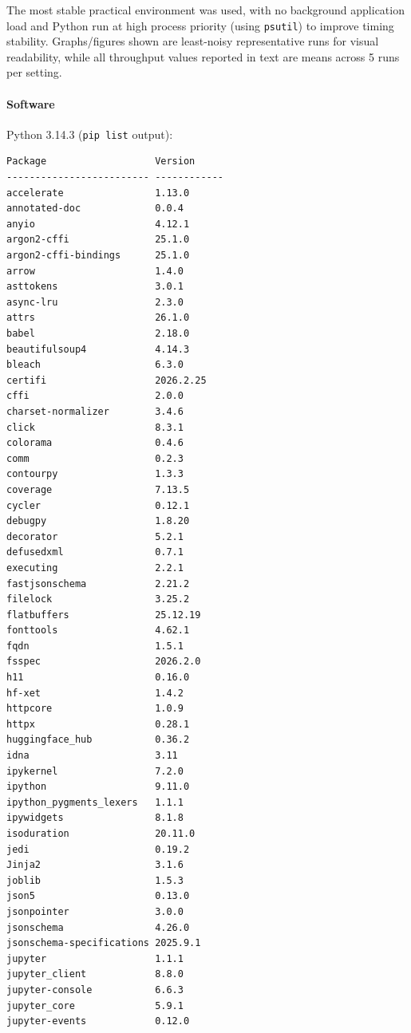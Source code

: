 \documentclass{article}
\begin{document}
The most stable practical environment was used, with no background
application load and Python run at high process priority (using
\texttt{psutil}) to improve timing stability. Graphs/figures shown are
least-noisy representative runs for visual readability, while all
throughput values reported in text are means across 5 runs per setting.

\hypertarget{software}{%
\paragraph{Software}\label{software}}

Python 3.14.3 (\texttt{pip\ list} output):

\begin{verbatim}
Package                   Version
------------------------- ------------
accelerate                1.13.0
annotated-doc             0.0.4
anyio                     4.12.1
argon2-cffi               25.1.0
argon2-cffi-bindings      25.1.0
arrow                     1.4.0
asttokens                 3.0.1
async-lru                 2.3.0
attrs                     26.1.0
babel                     2.18.0
beautifulsoup4            4.14.3
bleach                    6.3.0
certifi                   2026.2.25
cffi                      2.0.0
charset-normalizer        3.4.6
click                     8.3.1
colorama                  0.4.6
comm                      0.2.3
contourpy                 1.3.3
coverage                  7.13.5
cycler                    0.12.1
debugpy                   1.8.20
decorator                 5.2.1
defusedxml                0.7.1
executing                 2.2.1
fastjsonschema            2.21.2
filelock                  3.25.2
flatbuffers               25.12.19
fonttools                 4.62.1
fqdn                      1.5.1
fsspec                    2026.2.0
h11                       0.16.0
hf-xet                    1.4.2
httpcore                  1.0.9
httpx                     0.28.1
huggingface_hub           0.36.2
idna                      3.11
ipykernel                 7.2.0
ipython                   9.11.0
ipython_pygments_lexers   1.1.1
ipywidgets                8.1.8
isoduration               20.11.0
jedi                      0.19.2
Jinja2                    3.1.6
joblib                    1.5.3
json5                     0.13.0
jsonpointer               3.0.0
jsonschema                4.26.0
jsonschema-specifications 2025.9.1
jupyter                   1.1.1
jupyter_client            8.8.0
jupyter-console           6.6.3
jupyter_core              5.9.1
jupyter-events            0.12.0

\end{verbatim}
\end{document}
